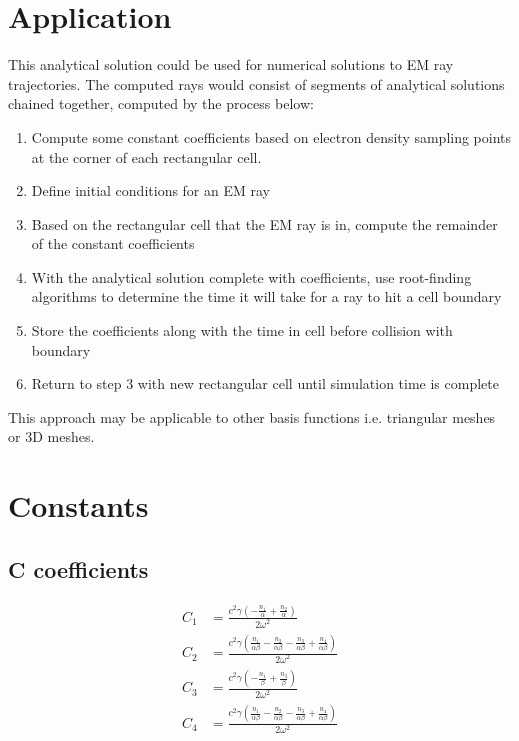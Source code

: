 \documentclass[11pt]{article}
\begin{document}
\section*{Application}
This analytical solution could be used for numerical solutions to EM ray trajectories. The computed rays would consist of segments of analytical solutions chained together, computed by the process below:
\begin{enumerate}
\item Compute some constant coefficients based on electron density sampling points at the corner of each rectangular cell.
\item Define initial conditions for an EM ray
\item Based on the rectangular cell that the EM ray is in, compute the remainder of the constant coefficients
\item With the analytical solution complete with coefficients, use root-finding algorithms to determine the time it will take for a ray to hit a cell boundary
\item Store the coefficients along with the time in cell before collision with boundary
\item Return to step 3 with new rectangular cell until simulation time is complete
\end{enumerate}
This approach may be applicable to other basis functions i.e. triangular meshes or 3D meshes.
\section*{Constants}
\subsection*{C coefficients}
\begin{align*}
C_{1} &= \frac{c^{2} \gamma \left(- \frac{n_{1}}{\alpha} + \frac{n_{2}}{\alpha}\right)}{2 \omega^{2}}
\tag{9a} \\
C_{2} &= \frac{c^{2} \gamma \left(\frac{n_{1}}{\alpha \beta} - \frac{n_{2}}{\alpha \beta} - \frac{n_{3}}{\alpha \beta} + \frac{n_{4}}{\alpha \beta}\right)}{2 \omega^{2}}
\tag{9b} \\
C_{3} &= \frac{c^{2} \gamma \left(- \frac{n_{1}}{\beta} + \frac{n_{3}}{\beta}\right)}{2 \omega^{2}}
\tag{9c} \\
C_{4} &= \frac{c^{2} \gamma \left(\frac{n_{1}}{\alpha \beta} - \frac{n_{2}}{\alpha \beta} - \frac{n_{3}}{\alpha \beta} + \frac{n_{4}}{\alpha \beta}\right)}{2 \omega^{2}} \tag{9d} \\
\end{align*}
\end{document}
